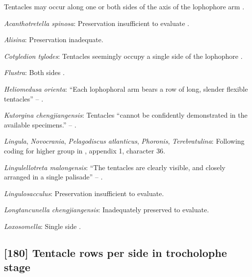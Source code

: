 \documentclass[openany]{book}
\theoremstyle{definition}
\theoremstyle{definition}
\theoremstyle{definition}
\theoremstyle{remark}
\begin{document}
Tentacles may occur along one or both sides of the axis of the
lophophore arm \citep{Carlson1995Phylogeneticrelationships}.

\hypertarget{Acanthotretella_spinosa-coding-179}{}
\emph{Acanthotretella spinosa}: Preservation insufficient to evaluate
\citep{Holmer2006Aspinose}.

\hypertarget{Alisina-coding-179}{}
\emph{Alisina}: Preservation inadequate.

\hypertarget{Cotyledion_tylodes-coding-179}{}
\emph{Cotyledion tylodes}: Tentacles seemingly occupy a single side of
the lophophore \citep{Zhang2013}.

\hypertarget{Flustra-coding-179}{}
\emph{Flustra}: Both sides \citep{Schwaha2015, Shunkina2015}.

\hypertarget{Heliomedusa_orienta-coding-179}{}
\emph{Heliomedusa orienta}: ``Each lophophoral arm bears a row of long,
slender flexible tentacles'' -- \citet{Zhang2009Architectureand}.

\hypertarget{Kutorgina_chengjiangensis-coding-179}{}
\emph{Kutorgina chengjiangensis}: Tentacles ``cannot be confidently
demonstrated in the available specimens.'' --
\citet{Zhang2007Rhynchonelliformeanbrachiopods}.

\hypertarget{Lingula-coding-179}{}
\emph{Lingula}, \emph{Novocrania}, \emph{Pelagodiscus atlanticus},
\emph{Phoronis}, \emph{Terebratulina}: Following coding for higher group
in \citet{Carlson1995Phylogeneticrelationships}, appendix 1, character
36.

\hypertarget{Lingulellotreta_malongensis-coding-179}{}
\emph{Lingulellotreta malongensis}: ``The tentacles are clearly visible,
and closely arranged in a single palisade'' -- \citet{Zhang2004Newdata}.

\hypertarget{Lingulosacculus-coding-179}{}
\emph{Lingulosacculus}: Preservation insufficient to evaluate.

\hypertarget{Longtancunella_chengjiangensis-coding-179}{}
\emph{Longtancunella chengjiangensis}: Inadequately preserved to
evaluate.

\hypertarget{Loxosomella-coding-179}{}
\emph{Loxosomella}: Single side \citep{Nielsen1966}.

\subsection*{{[}180{]} Tentacle rows per side in trocholophe
stage}\label{tentacle-rows-per-side-in-trocholophe-stage}
\end{document}
